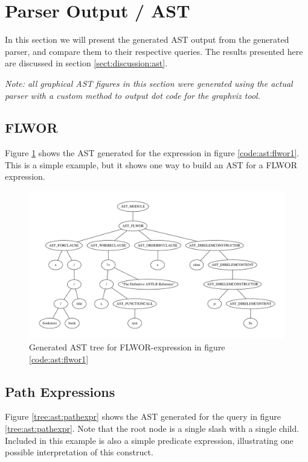 \section{Parser Output / AST}
\label{sect:results:parser_output_ast}
In this section we will present the generated AST output from the generated
parser, and compare them to their respective queries. The results presented here
are discussed in section \ref{sect:discussion:ast}.

\emph{Note: all graphical AST figures in this section were generated using the
actual parser with a custom method to output dot code for the graphviz tool.}

\subsection{FLWOR}
Figure \ref{tree:ast:flwor1} shows the AST generated for the expression in
figure \ref{code:ast:flwor1}. This is a simple example, but it shows one way to
build an AST for a FLWOR expression.

\pagebreak
\begin{figure}[h!]

\caption{FLWOR expression example, generates AST seen in figure \ref{tree:ast:flwor1}}
\label{code:ast:flwor1}
\centering
 \includegraphics[width=1\textwidth]{img/graphs/flwor1}
\caption{Generated AST tree for FLWOR-expression in figure \ref{code:ast:flwor1}}
\label{tree:ast:flwor1}
\end{figure}

\subsection{Path Expressions}
Figure \ref{tree:ast:pathexpr} shows the AST generated for the query in figure
\ref{tree:ast:pathexpr}. Note that the root node is a single slash with a
single child. Included in this example is also a simple predicate expression,
illustrating one possible interpretation of this construct.


